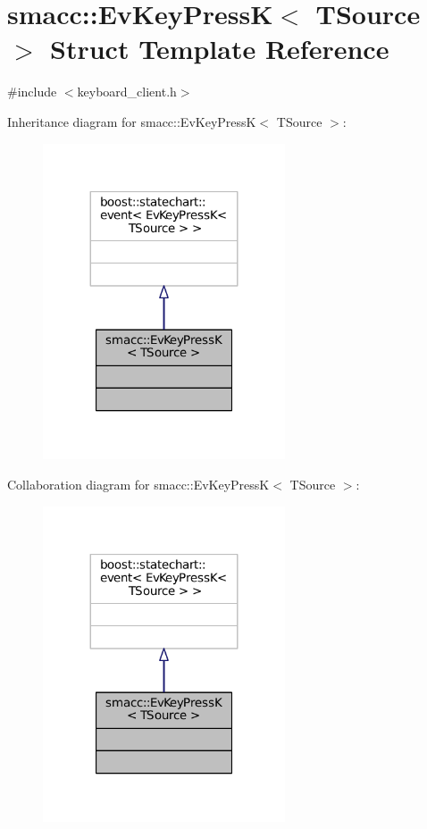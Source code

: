 \hypertarget{structsmacc_1_1EvKeyPressK}{}\section{smacc\+:\+:Ev\+Key\+PressK$<$ T\+Source $>$ Struct Template Reference}
\label{structsmacc_1_1EvKeyPressK}


{\ttfamily \#include $<$keyboard\+\_\+client.\+h$>$}



Inheritance diagram for smacc\+:\+:Ev\+Key\+PressK$<$ T\+Source $>$\+:
\nopagebreak
\begin{figure}[H]
\begin{center}
\leavevmode
\includegraphics[width=203pt]{structsmacc_1_1EvKeyPressK__inherit__graph}
\end{center}
\end{figure}


Collaboration diagram for smacc\+:\+:Ev\+Key\+PressK$<$ T\+Source $>$\+:
\nopagebreak
\begin{figure}[H]
\begin{center}
\leavevmode
\includegraphics[width=203pt]{structsmacc_1_1EvKeyPressK__coll__graph}
\end{center}
\end{figure}


